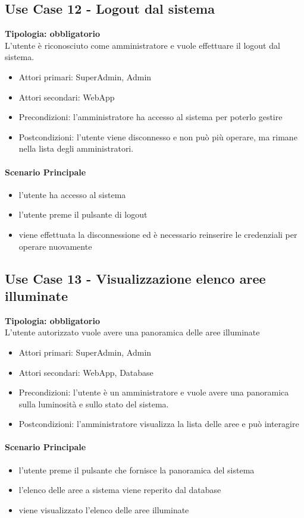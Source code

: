 \documentclass[12pt]{article}
\begin{document}
\subsection{Use Case 12 - Logout dal sistema}
\textbf{Tipologia: obbligatorio} \\
L'utente è riconosciuto come amministratore e vuole effettuare il logout dal sistema.
\begin{itemize}
	\item Attori primari: SuperAdmin, Admin
	\item Attori secondari: WebApp
	\item Precondizioni: l'amministratore ha accesso al sistema per poterlo gestire
	\item Postcondizioni: l'utente viene disconnesso e non può più operare, ma rimane nella lista degli amministratori.
\end{itemize}
\paragraph{Scenario Principale}
\begin{itemize}
	\item l'utente ha accesso al sistema
	\item l'utente preme il pulsante di logout
	\item viene effettuata la disconnessione ed è necessario reinserire le credenziali per operare nuovamente
\end{itemize}

\subsection{Use Case 13 - Visualizzazione elenco aree illuminate}
\textbf{Tipologia: obbligatorio} \\
L'utente autorizzato vuole avere una panoramica delle aree illuminate
\begin{itemize}
	\item Attori primari: SuperAdmin, Admin
	\item Attori secondari: WebApp, Database
	\item Precondizioni: l'utente è un amministratore e vuole avere una panoramica sulla luminosità e sullo stato del sistema.
	\item Postcondizioni: l'amministratore visualizza la lista delle aree e può interagire
\end{itemize}
\paragraph{Scenario Principale}
\begin{itemize}
	\item l'utente preme il pulsante che fornisce la panoramica del sistema
	\item l'elenco delle aree a sistema viene reperito dal database
	\item viene visualizzato l'elenco delle aree illuminate
\end{itemize}
\end{document}
